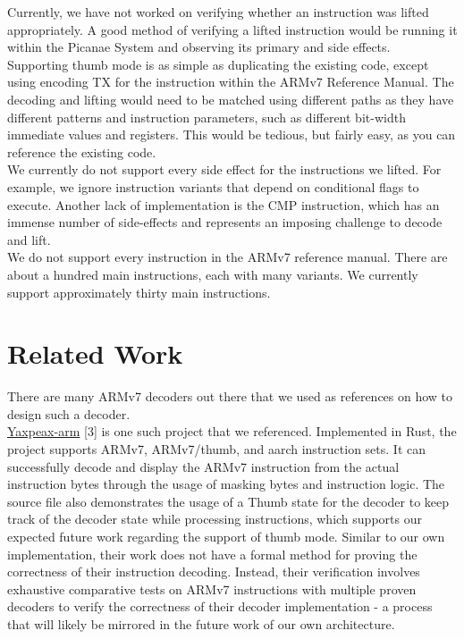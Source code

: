 \documentclass[twocolumn]{article}
\begin{document}
Currently, we have not worked on verifying whether an instruction was lifted appropriately. A good method of verifying a lifted instruction would be running it within the Picanae System and observing its primary and side effects.\\

Supporting thumb mode is as simple as duplicating the existing code, except using encoding TX for the instruction within the ARMv7 Reference Manual. The decoding and lifting would need to be matched using different paths as they have different patterns and instruction parameters, such as different bit-width immediate values and registers. This would be tedious, but fairly easy, as you can reference the existing code.\\

We currently do not support every side effect for the instructions we lifted. For example, we ignore instruction variants that depend on conditional flags to execute. Another lack of implementation is the CMP instruction, which has an immense number of side-effects and represents an imposing challenge to decode and lift.\\

We do not support every instruction in the ARMv7 reference manual. There are about a hundred main instructions, each with many variants. We currently support approximately thirty main instructions.

\section*{\centering Related Work}
\vspace{0.3cm}

There are many ARMv7 decoders out there that we used as references on how to design such a decoder.\\

\href{https://github.com/iximeow/yaxpeax-arm}{Yaxpeax-arm} [3] is one such project that we referenced. Implemented in Rust, the project supports ARMv7, ARMv7/thumb, and aarch instruction sets. It can successfully decode and display the ARMv7 instruction from the actual instruction bytes through the usage of masking bytes and instruction logic. The source file also demonstrates the usage of a Thumb state for the decoder to keep track of the decoder state while processing instructions, which supports our expected future work regarding the support of thumb mode. Similar to our own implementation, their work does not have a formal method for proving the correctness of their instruction decoding. Instead, their verification involves exhaustive comparative tests on ARMv7 instructions with multiple proven decoders to verify the correctness of their decoder implementation - a process that will likely be mirrored in the future work of our own architecture.\\
\end{document}
